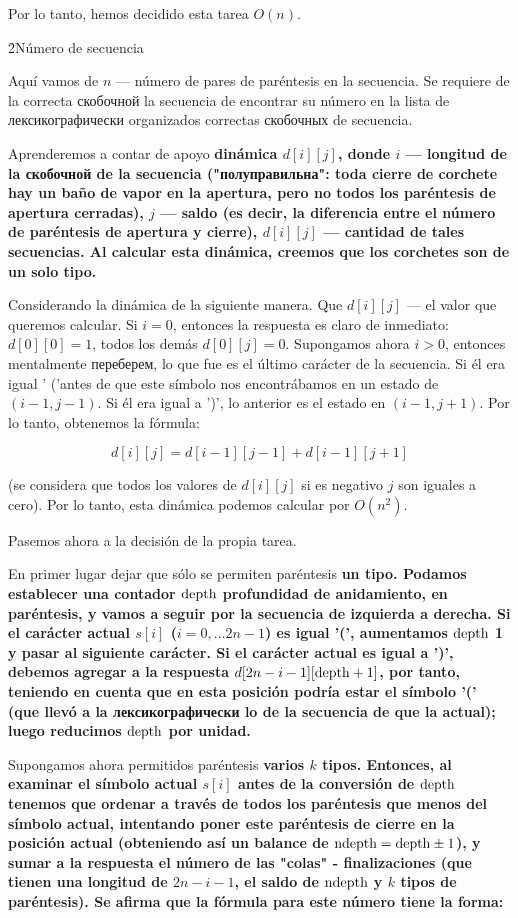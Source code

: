 Por lo tanto, hemos decidido esta tarea $O(n)$.


\h2{Número de secuencia}

Aquí vamos de $n$ --- número de pares de paréntesis en la secuencia. Se requiere de la correcta скобочной la secuencia de encontrar su número en la lista de лексикографически organizados correctas скобочных de secuencia.

Aprenderemos a contar de apoyo \bf{dinámica} $d[i][j]$, donde $i$ --- longitud de la скобочной de la secuencia ("полуправильна": toda cierre de corchete hay un baño de vapor en la apertura, pero no todos los paréntesis de apertura cerradas), $j$ --- saldo (es decir, la diferencia entre el número de paréntesis de apertura y cierre), $d[i][j]$ --- cantidad de tales secuencias. Al calcular esta dinámica, creemos que los corchetes son de un solo tipo.

Considerando la dinámica de la siguiente manera. Que $d[i][j]$ --- el valor que queremos calcular. Si $i=0$, entonces la respuesta es claro de inmediato: $d[0][0] = 1$, todos los demás $d[0][j] = 0$. Supongamos ahora $i > 0$, entonces mentalmente переберем, lo que fue es el último carácter de la secuencia. Si él era igual ' ('antes de que este símbolo nos encontrábamos en un estado de $(i-1,j-1)$. Si él era igual a ')', lo anterior es el estado en $(i-1,j+1)$. Por lo tanto, obtenemos la fórmula:

$$ d[i][j] = d[i-1][j-1] + d[i-1][j+1] $$

(se considera que todos los valores de $d[i][j]$ si es negativo $j$ son iguales a cero). Por lo tanto, esta dinámica podemos calcular por $O(n^2)$.

Pasemos ahora a la decisión de la propia tarea.

En primer lugar dejar que sólo se permiten paréntesis \bf{un} tipo. Podamos establecer una contador $\rm depth$ profundidad de anidamiento, en paréntesis, y vamos a seguir por la secuencia de izquierda a derecha. Si el carácter actual $s[i]$ ($i=0, \ldots 2n-1$) es igual '(', aumentamos $\rm depth$ 1 y pasar al siguiente carácter. Si el carácter actual es igual a ')', debemos agregar a la respuesta $d[2n-i-1][\rm depth+1]$, por tanto, teniendo en cuenta que en esta posición podría estar el símbolo '(' (que llevó a la лексикографически lo de la secuencia de que la actual); luego reducimos $\rm depth$ por unidad.

Supongamos ahora permitidos paréntesis \bf{varios} $k$ tipos. Entonces, al examinar el símbolo actual $s[i]$ antes de la conversión de $\rm depth$ tenemos que ordenar a través de todos los paréntesis que menos del símbolo actual, intentando poner este paréntesis de cierre en la posición actual (obteniendo así un balance de $\rm ndepth = \rm depth \pm 1$), y sumar a la respuesta el número de las "colas" - finalizaciones (que tienen una longitud de $2n-i-1$, el saldo de $\rm ndepth$ y $k$ tipos de paréntesis). Se afirma que la fórmula para este número tiene la forma:

